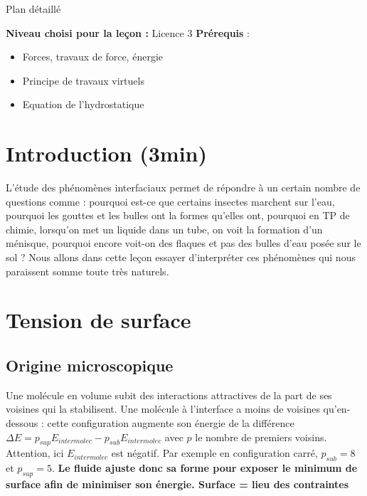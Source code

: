\begin{reportBlock}{Plan détaillé}

  \textbf{Niveau choisi pour la leçon :} Licence 3
  \newline
  \textbf{Prérequis} : \begin{itemize}
      \item Forces, travaux de force, énergie
      \item Principe de travaux virtuels
      \item Equation de l'hydrostatique
  \end{itemize}
  
  \section*{Introduction (3min)}
L'étude des phénomènes interfaciaux permet de répondre à un certain nombre de questions comme : pourquoi est-ce que certains insectes marchent sur l'eau, pourquoi les gouttes et les bulles ont la formes qu'elles ont, pourquoi en TP de chimie, lorsqu'on met un liquide dans un tube, on voit la formation d'un ménisque, pourquoi encore voit-on des flaques et pas des bulles d'eau posée sur le sol ? Nous allons dans cette leçon essayer d'interpréter ces phénomènes qui nous paraissent somme toute très naturels.

  \section{Tension de surface}
  \subsection{Origine microscopique}
  Une molécule en volume subit des interactions attractives de la part de ses voisines qui la stabilisent. Une molécule à l'interface a moins de voisines qu'en-dessous : cette configuration augmente son énergie de la différence $\Delta E = p_{sup}E_{intermolec}-p_{sub}E_{intermolec}$ avec $p$ le nombre de premiers voisins. Attention, ici $E_{intermolec}$ est négatif. Par exemple en configuration carré, $p_{sub}=8$ et $p_{sup}=5$. \textbf{Le fluide ajuste donc sa forme pour exposer le minimum de surface afin de minimiser son énergie. Surface = lieu des contraintes}
  

\end{reportBlock}

